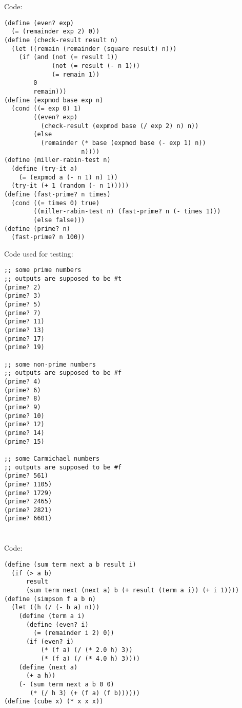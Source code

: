 \documentclass[a4paper]{report}
\begin{document}

\section{}

Code:

\begin{lstlisting}
(define (even? exp)
  (= (remainder exp 2) 0))
(define (check-result result n)
  (let ((remain (remainder (square result) n)))
    (if (and (not (= result 1))
             (not (= result (- n 1)))
             (= remain 1))
        0
        remain)))
(define (expmod base exp n)
  (cond ((= exp 0) 1)
        ((even? exp)
          (check-result (expmod base (/ exp 2) n) n))
        (else
          (remainder (* base (expmod base (- exp 1) n))
                     n))))
(define (miller-rabin-test n)
  (define (try-it a)
    (= (expmod a (- n 1) n) 1))
  (try-it (+ 1 (random (- n 1)))))
(define (fast-prime? n times)
  (cond ((= times 0) true)
        ((miller-rabin-test n) (fast-prime? n (- times 1)))
        (else false)))
(define (prime? n)
  (fast-prime? n 100))
\end{lstlisting}

Code used for testing:

\begin{lstlisting}
;; some prime numbers
;; outputs are supposed to be #t
(prime? 2)
(prime? 3)
(prime? 5)
(prime? 7)
(prime? 11)
(prime? 13)
(prime? 17)
(prime? 19)

;; some non-prime numbers
;; outputs are supposed to be #f
(prime? 4)
(prime? 6)
(prime? 8)
(prime? 9)
(prime? 10)
(prime? 12)
(prime? 14)
(prime? 15)

;; some Carmichael numbers
;; outputs are supposed to be #f
(prime? 561)
(prime? 1105)
(prime? 1729)
(prime? 2465)
(prime? 2821)
(prime? 6601)
\end{lstlisting}


\section{}

Code:

\begin{lstlisting}
(define (sum term next a b result i)
  (if (> a b)
      result
      (sum term next (next a) b (+ result (term a i)) (+ i 1))))
(define (simpson f a b n)
  (let ((h (/ (- b a) n)))
    (define (term a i)
      (define (even? i)
        (= (remainder i 2) 0))
      (if (even? i)
          (* (f a) (/ (* 2.0 h) 3))
          (* (f a) (/ (* 4.0 h) 3))))
    (define (next a)
      (+ a h))
    (- (sum term next a b 0 0)
       (* (/ h 3) (+ (f a) (f b))))))
(define (cube x) (* x x x))
\end{lstlisting}
\end{document}
